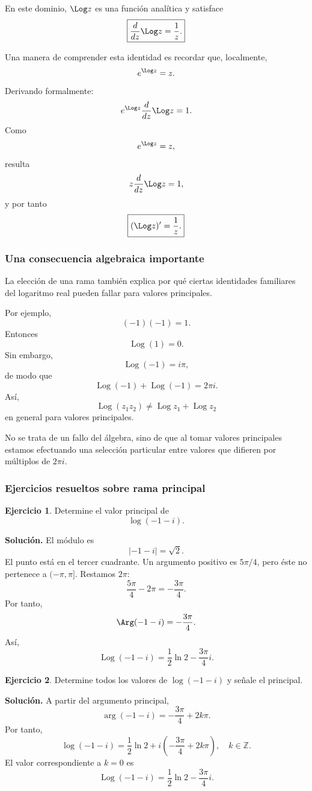 \documentclass[12pt]{article}
\theoremstyle{definition}
\newtheorem{ejercicio}{Ejercicio}[section]
\theoremstyle{remark}
\begin{document}
En este dominio, $\Log z$ es una función analítica y satisface
\[
\boxed{
\frac{d}{dz}\Log z=\frac1z.
}
\]

Una manera de comprender esta identidad es recordar que, localmente,
\[
e^{\Log z}=z.
\]
Derivando formalmente:
\[
e^{\Log z}\frac{d}{dz}\Log z=1.
\]
Como
\[
e^{\Log z}=z,
\]
resulta
\[
z\frac{d}{dz}\Log z=1,
\]
y por tanto
\[
\boxed{
(\Log z)'=\frac1z.
}
\]

\subsubsection{Una consecuencia algebraica importante}

La elección de una rama también explica por qué ciertas identidades familiares
del logaritmo real pueden fallar para valores principales.

Por ejemplo,
\[
(-1)(-1)=1.
\]
Entonces
\[
\operatorname{Log}(1)=0.
\]
Sin embargo,
\[
\operatorname{Log}(-1)=i\pi,
\]
de modo que
\[
\operatorname{Log}(-1)+\operatorname{Log}(-1)=2\pi i.
\]
Así,
\[
\boxed{
\operatorname{Log}(z_1z_2)
\neq
\operatorname{Log}z_1+\operatorname{Log}z_2
}
\]
en general para valores principales.

No se trata de un fallo del álgebra, sino de que al tomar valores principales
estamos efectuando una selección particular entre valores que difieren por
múltiplos de $2\pi i$.

\subsubsection{Ejercicios resueltos sobre rama principal}

\begin{ejercicio}
Determine el valor principal de
\[
\log(-1-i).
\]
\end{ejercicio}

\textbf{Solución.}
El módulo es
\[
|-1-i|=\sqrt2.
\]
El punto está en el tercer cuadrante. Un argumento positivo es $5\pi/4$, pero
éste no pertenece a $(-\pi,\pi]$. Restamos $2\pi$:
\[
\frac{5\pi}{4}-2\pi=-\frac{3\pi}{4}.
\]
Por tanto,
\[
\Arg(-1-i)=-\frac{3\pi}{4}.
\]
Así,
\[
\boxed{
\operatorname{Log}(-1-i)
=
\frac12\ln2-\frac{3\pi}{4}i.
}
\]

\begin{ejercicio}
Determine todos los valores de $\log(-1-i)$ y señale el principal.
\end{ejercicio}

\textbf{Solución.}
A partir del argumento principal,
\[
\arg(-1-i)
=
-\frac{3\pi}{4}+2k\pi.
\]
Por tanto,
\[
\boxed{
\log(-1-i)
=
\frac12\ln2
+i\left(-\frac{3\pi}{4}+2k\pi\right),
\quad k\in\mathbb Z.
}
\]
El valor correspondiente a $k=0$ es
\[
\boxed{
\operatorname{Log}(-1-i)
=
\frac12\ln2-\frac{3\pi}{4}i.
}
\]
\end{document}
